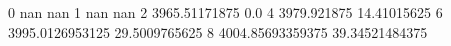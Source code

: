 0 nan nan
1 nan nan
2 3965.51171875 0.0
4 3979.921875 14.41015625
6 3995.0126953125 29.5009765625
8 4004.85693359375 39.34521484375
